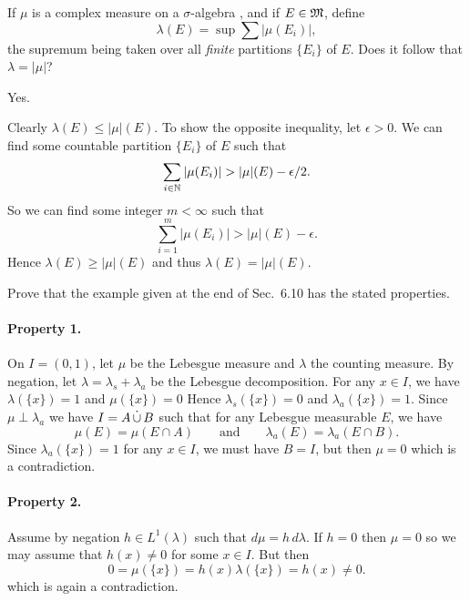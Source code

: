 \begin{enumerate}

\begin{excopy}
If \(\mu\) is a complex measure on a \(\sigma\)-algebra \frakM,
and if \(E \in \mathfrak{M}\), define
\begin{equation*}
\lambda(E) = \sup \sum |\mu(E_i)|,
\end{equation*}
the supremum being taken over all \emph{finite} partitions \(\{E_i\}\) of $E$.
Does it follow that \(\lambda = |\mu|\)?
\end{excopy}

Yes.

Clearly \(\lambda(E) \leq |\mu|(E)\). To show the opposite inequality,
let \(\epsilon > 0\). We can find some countable
partition \(\{E_i\}\) of $E$
such that
\begin{equation*}
 \sum_{i\in\mathbb{N}} |\mu(E_i)| > |\mu|(E) - \epsilon/2.
\end{equation*}
So  we can find some integer \(m<\infty\) such that
\begin{equation*}
 \sum_{i=1}^m |\mu(E_i)| > |\mu|(E) - \epsilon.
\end{equation*}
Hence \(\lambda(E) \geq |\mu|(E)\) and thus
\(\lambda(E) = |\mu|(E)\).


\begin{excopy}
Prove that the example given at the end of Sec.~6.10 has the stated properties.
\end{excopy}

\paragraph{Property 1.}
On \(I=(0,1)\), let \(\mu\) be the Lebesgue measure
and \(\lambda\) the counting measure.
By negation, let \(\lambda = \lambda_s + \lambda_a\) be the
Lebesgue decomposition.
For any \(x\in I\), we have
 \(\lambda(\{x\}) = 1\) and  \(\mu(\{x\}) = 0\)
Hence
\(\lambda_s(\{x\}) = 0\) and  \(\lambda_a(\{x\}) = 1\).
Since \(\mu\perp \lambda_a\) we have \(I = A \disjunion B\)
such that for any Lebesgue measurable $E$, we have
\begin{equation*}
\mu(E) = \mu(E\cap A) \qquad \textrm{and} \qquad
\lambda_a(E) = \lambda_a(E\cap B).
\end{equation*}
Since
\(\lambda_a(\{x\}) = 1\)
for any \(x\in I\), we must have \(B=I\), but then \(\mu=0\)
which is a contradiction.

\paragraph{Property 2.}
Assume by negation \(h\in L^1(\lambda)\) such that \(d\mu = h\,d\lambda\).
If \(h=0\) then \(\mu=0\) so we may assume that \(h(x)\neq 0\)
for some \(x\in I\). But then
\begin{equation*}
0 = \mu(\{x\}) = h(x)\lambda(\{x\}) = h(x) \neq 0.
\end{equation*}
which is again a contradiction.



\end{enumerate}
